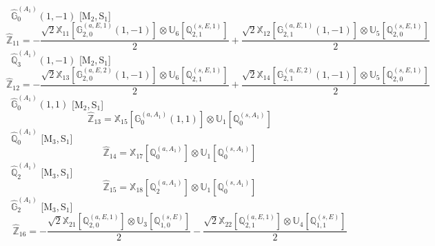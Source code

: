\documentclass[fleqn,10pt,landscape]{article}
\begin{document}
\begin{itemize}
\noindent {} $\,\,\,\hat{\mathbb{G}}_{0}^{(A_{1})}(1,-1)$ [M$_{2}$,\,S$_{1}$]
\begin{dmath*}
\hat{\mathbb{Z}}_{11}=- \frac{\sqrt{2} \mathbb{X}_{11}[\mathbb{G}_{2,0}^{(a,E,1)}(1,-1)] \otimes\mathbb{U}_{6}[\mathbb{Q}_{2,1}^{(s,E,1)}]}{2} + \frac{\sqrt{2} \mathbb{X}_{12}[\mathbb{G}_{2,1}^{(a,E,1)}(1,-1)] \otimes\mathbb{U}_{5}[\mathbb{Q}_{2,0}^{(s,E,1)}]}{2}
\end{dmath*}
\vspace{4mm}
\noindent {} $\,\,\,\hat{\mathbb{Q}}_{3}^{(A_{1})}(1,-1)$ [M$_{2}$,\,S$_{1}$]
\begin{dmath*}
\hat{\mathbb{Z}}_{12}=- \frac{\sqrt{2} \mathbb{X}_{13}[\mathbb{G}_{2,0}^{(a,E,2)}(1,-1)] \otimes\mathbb{U}_{6}[\mathbb{Q}_{2,1}^{(s,E,1)}]}{2} + \frac{\sqrt{2} \mathbb{X}_{14}[\mathbb{G}_{2,1}^{(a,E,2)}(1,-1)] \otimes\mathbb{U}_{5}[\mathbb{Q}_{2,0}^{(s,E,1)}]}{2}
\end{dmath*}
\vspace{4mm}
\noindent {} $\,\,\,\hat{\mathbb{G}}_{0}^{(A_{1})}(1,1)$ [M$_{2}$,\,S$_{1}$]
\begin{dmath*}
\hat{\mathbb{Z}}_{13}=\mathbb{X}_{15}[\mathbb{G}_{0}^{(a,A_{1})}(1,1)] \otimes\mathbb{U}_{1}[\mathbb{Q}_{0}^{(s,A_{1})}]
\end{dmath*}
\vspace{4mm}
\noindent {} $\,\,\,\hat{\mathbb{Q}}_{0}^{(A_{1})}$ [M$_{3}$,\,S$_{1}$]
\begin{dmath*}
\hat{\mathbb{Z}}_{14}=\mathbb{X}_{17}[\mathbb{Q}_{0}^{(a,A_{1})}] \otimes\mathbb{U}_{1}[\mathbb{Q}_{0}^{(s,A_{1})}]
\end{dmath*}
\vspace{4mm}
\noindent {} $\,\,\,\hat{\mathbb{Q}}_{2}^{(A_{1})}$ [M$_{3}$,\,S$_{1}$]
\begin{dmath*}
\hat{\mathbb{Z}}_{15}=\mathbb{X}_{18}[\mathbb{Q}_{2}^{(a,A_{1})}] \otimes\mathbb{U}_{1}[\mathbb{Q}_{0}^{(s,A_{1})}]
\end{dmath*}
\vspace{4mm}
\noindent {} $\,\,\,\hat{\mathbb{G}}_{2}^{(A_{1})}$ [M$_{3}$,\,S$_{1}$]
\begin{dmath*}
\hat{\mathbb{Z}}_{16}=- \frac{\sqrt{2} \mathbb{X}_{21}[\mathbb{Q}_{2,0}^{(a,E,1)}] \otimes\mathbb{U}_{3}[\mathbb{Q}_{1,0}^{(s,E)}]}{2} - \frac{\sqrt{2} \mathbb{X}_{22}[\mathbb{Q}_{2,1}^{(a,E,1)}] \otimes\mathbb{U}_{4}[\mathbb{Q}_{1,1}^{(s,E)}]}{2}
\end{dmath*}
\vspace{4mm}

\end{itemize}
\end{document}
